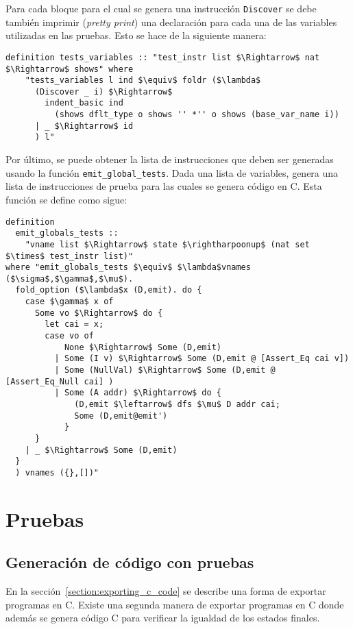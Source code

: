 Para cada bloque para el cual se genera una instrucción \verb|Discover| se debe también imprimir (\textit{pretty print}) una declaración para cada una de las variables utilizadas en las pruebas.
Esto se hace de la siguiente manera:

\begin{lstlisting}[mathescape=true, frame=single]
  definition tests_variables :: "test_instr list $\Rightarrow$ nat $\Rightarrow$ shows" where
    "tests_variables l ind $\equiv$ foldr ($\lambda$
      (Discover _ i) $\Rightarrow$
        indent_basic ind
          (shows dflt_type o shows '' *'' o shows (base_var_name i))
      | _ $\Rightarrow$ id
      ) l"
\end{lstlisting}


Por último, se puede obtener la lista de instrucciones que deben ser generadas usando la función \verb|emit_global_tests|.
Dada una lista de variables, genera una lista de instrucciones de prueba para las cuales se genera código en C.
Esta función se define como sigue:


\begin{lstlisting}[mathescape=true, frame=single]
definition
  emit_globals_tests ::
    "vname list $\Rightarrow$ state $\rightharpoonup$ (nat set $\times$ test_instr list)"
where "emit_globals_tests $\equiv$ $\lambda$vnames ($\sigma$,$\gamma$,$\mu$).
  fold_option ($\lambda$x (D,emit). do {
    case $\gamma$ x of
      Some vo $\Rightarrow$ do {
        let cai = x;
        case vo of
            None $\Rightarrow$ Some (D,emit)
          | Some (I v) $\Rightarrow$ Some (D,emit @ [Assert_Eq cai v])
          | Some (NullVal) $\Rightarrow$ Some (D,emit @ [Assert_Eq_Null cai] )
          | Some (A addr) $\Rightarrow$ do {
              (D,emit $\leftarrow$ dfs $\mu$ D addr cai;
              Some (D,emit@emit')
            }
      }
    | _ $\Rightarrow$ Some (D,emit)
  }
  ) vnames ({},[])"
\end{lstlisting}


\section{Pruebas}

\subsection{Generación de código con pruebas}\label{subsection:codegen_with_tests}

En la sección~\ref{section:exporting_c_code} se describe una forma de exportar programas en C.
Existe una segunda manera de exportar programas en C donde además se genera código C para verificar la igualdad de los estados finales.

